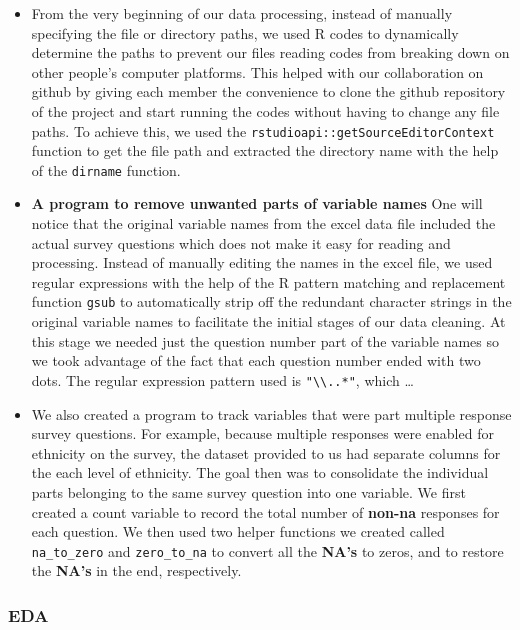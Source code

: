 \documentclass[
  10pt,
]{article}
\begin{document}
\begin{itemize}
\item
  From the very beginning of our data processing, instead of manually specifying the file or directory paths, we used R codes to dynamically determine the paths to prevent our files reading codes from breaking down on other people's computer platforms. This helped with our collaboration on github by giving each member the convenience to clone the github repository of the project and start running the codes without having to change any file paths. To achieve this, we used the \texttt{rstudioapi::getSourceEditorContext} function to get the file path and extracted the directory name with the help of the \texttt{dirname} function.
\item
  \textbf{A program to remove unwanted parts of variable names}
  One will notice that the original variable names from the excel data file included the actual survey questions which does not make it easy for reading and processing. Instead of manually editing the names in the excel file, we used regular expressions with the help of the R pattern matching and replacement function \texttt{gsub} to automatically strip off the redundant character strings in the original variable names to facilitate the initial stages of our data cleaning. At this stage we needed just the question number part of the variable names so we took advantage of the fact that each question number ended with two dots. The regular expression pattern used is \texttt{"\textbackslash{}\textbackslash{}..*"}, which \ldots{}
\item
  We also created a program to track variables that were part multiple response survey questions. For example, because multiple responses were enabled for ethnicity on the survey, the dataset provided to us had separate columns for the each level of ethnicity. The goal then was to consolidate the individual parts belonging to the same survey question into one variable. We first created a count variable to record the total number of \textbf{non-na} responses for each question. We then used two helper functions we created called \texttt{na\_to\_zero} and \texttt{zero\_to\_na} to convert all the \textbf{NA's} to zeros, and to restore the \textbf{NA's} in the end, respectively.
\end{itemize}

\hypertarget{eda}{%
\subsubsection{EDA}\label{eda}}
\end{document}
